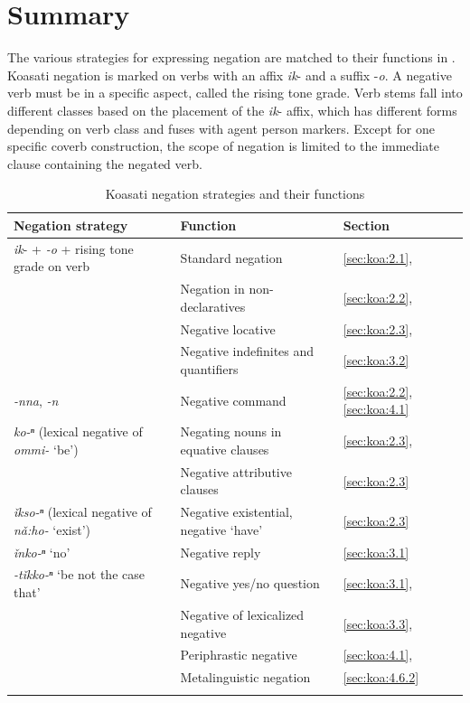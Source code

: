 \documentclass[output=paper,colorlinks,citecolor=brown]{langscibook}
\begin{document}
\section{Summary}\label{sec:koa:5}
The various strategies for expressing negation are matched to their functions in .
Koasati negation is marked on verbs with an affix \textit{ik}- and a suffix -\textit{o}. A negative verb must be in a specific aspect, called the rising tone grade. Verb stems fall into different classes based on the placement of the \textit{ik}- affix, which has different forms depending on verb class and fuses with agent person markers.
Except for one specific coverb construction, the scope of negation is limited to the immediate clause containing the negated verb.

\begin{table}
    \begin{tabularx}{\textwidth}{QQl}
\lsptoprule
Negation strategy & Function & Section\\
\midrule
\textit{ik}- + \textit{-o} + rising tone grade on verb 
& Standard negation & \ref{sec:koa:2.1}, \\
& Negation in non-declaratives & \ref{sec:koa:2.2}, \\
& Negative locative & \ref{sec:koa:2.3},\\
& Negative indefinites and quantifiers & \ref{sec:koa:3.2} \\
\tablevspace
\textit{-nna}, \textit{-n} 
& Negative command & \ref{sec:koa:2.2},   \ref{sec:koa:4.1} \\
\tablevspace
\textit{ko-ⁿ} (lexical negative of \textit{ommi-} ‘be’) 
& Negating nouns in equative clauses & \ref{sec:koa:2.3},\\
& Negative attributive clauses & \ref{sec:koa:2.3}  \\
\tablevspace
\textit{ǐkso-ⁿ} (lexical negative of \textit{nǎ:ho-} ‘exist’) 
& Negative existential, negative ‘have’ & \ref{sec:koa:2.3}  \\
\tablevspace
\textit{ǐnko-ⁿ} ‘no’ 
& Negative reply & \ref{sec:koa:3.1}  \\
\tablevspace
\textit{-tǐkko-ⁿ} ‘be not the case that’ 
& Negative yes/no question & \ref{sec:koa:3.1}, \\
& Negative of lexicalized negative & \ref{sec:koa:3.3}, \\
& Periphrastic negative & \ref{sec:koa:4.1}, \\
& Metalinguistic negation & \ref{sec:koa:4.6.2}  \\
\lspbottomrule
    \end{tabularx}
    \caption{Koasati negation strategies and their functions}
    \label{tab:koa:4}
\end{table}
\end{document}
